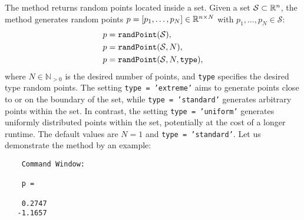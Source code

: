 \begin{center}
\begin{minipage}[t]{0.38\textwidth}
	\vspace{10pt}
	\footnotesize
	
\end{minipage}
\begin{minipage}[t]{0.6\textwidth}
	\vspace{0pt}
	\centering
\end{minipage}
\end{center}


The method  returns random points located inside a set. Given a set $\mathcal{S} \subset \mathbb{R}^n$, the method  generates random points $p = [p_1,\dots,p_N] \in \mathbb{R}^{n \times N}$ with $p_1,\dots, p_N \in \mathcal{S}$:
\begin{equation*}
	\begin{split}
		& p = {\normalfont \texttt{randPoint}}(\mathcal{S}), \\
		& p = {\normalfont \texttt{randPoint}}(\mathcal{S},N), \\
		& p = {\normalfont \texttt{randPoint}}(\mathcal{S},N,\texttt{type}),
   \end{split}
\end{equation*}
where $N \in \mathbb{N}_{> 0}$ is the desired number of points, and \texttt{type} specifies the desired type random points. The setting \texttt{type = 'extreme'} aims to generate points close to or on the boundary of the set, while \texttt{type = 'standard'} generates arbitrary points within the set. In contrast, the setting \texttt{type = 'uniform'} generates uniformly distributed points within the set, potentially at the cost of a longer runtime. The default values are $N = 1$ and \texttt{type = 'standard'}. Let us demonstrate the method  by an example:

\begin{center}
\begin{minipage}[t]{0.40\textwidth}
	\vspace{10pt}
	\footnotesize
	
\end{minipage}
\begin{minipage}[t]{0.2\textwidth}
	\vspace{10pt}

	\begin{verbatim}
	Command Window:
		
	p =

    0.2747
   -1.1657
	\end{verbatim}
\end{minipage}
\begin{minipage}[t]{0.3\textwidth}
	\vspace{0pt}
	\centering
\end{minipage}
\end{center}


